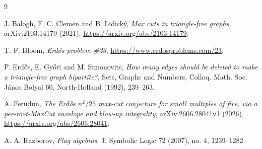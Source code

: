 \documentclass[11pt]{article}
\begin{document}
\begin{thebibliography}{9}

J. Balogh, F. C. Clemen and B. Lidick\'y,
\emph{Max cuts in triangle-free graphs},
arXiv:2103.14179 (2021),
\url{https://arxiv.org/abs/2103.14179}.

T. F. Bloom,
\emph{Erd\H{o}s problem \#23},
\url{https://www.erdosproblems.com/23}.

P. Erd\H{o}s, E. Gy\H{o}ri and M. Simonovits,
\emph{How many edges should be deleted to make a triangle-free graph
bipartite?},
Sets, Graphs and Numbers, Colloq. Math. Soc. J\'anos Bolyai 60,
North-Holland (1992), 239--263.

A. Ferudun,
\emph{The Erd\H{o}s $n^2/25$ max-cut conjecture for small multiples of five,
via a per-root-MaxCut envelope and blow-up integrality},
arXiv:2606.28041v1 (2026),
\url{https://arxiv.org/abs/2606.28041}.

A. A. Razborov,
\emph{Flag algebras},
J. Symbolic Logic 72 (2007), no. 4, 1239--1282.

\end{thebibliography}
\end{document}
